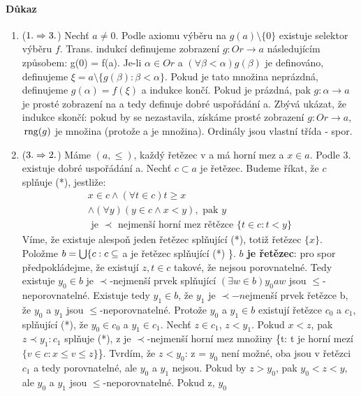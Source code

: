 \documentclass[a4paper,12pt,titlepage]{article}
\begin{document}
\paragraph{Důkaz}
\begin{enumerate}
	\item ($1. \Rightarrow 3.$) Nechť $a \neq 0$. Podle axiomu výběru na $g(a)
	\setminus \{0\}$ existuje selektor výběru $f$. Trans. indukcí definujeme
	zobrazení $g: Or \to a$ následujícím způsobem:
	g(0) = f(a). Je-li $\alpha \in Or$ a $(\forall \beta < \alpha) g(\beta)$ je
	definováno, definujeme $\xi = a \setminus \{g(\beta) : \beta < \alpha \}$.
	Pokud je tato množina neprázdná, definujeme $g(\alpha) = f (\xi)$ a indukce
	končí. Pokud je prázdná, pak $g: \alpha \to a$ je prosté zobrazení na a
	tedy definuje dobré uspořádání a. Zbývá ukázat, že indukce skončí: pokud by
	se nezastavila, získáme prosté zobrazení $g: Or \to a$, $\operatorname*{\,rng}(g)$ je množina
	(protože a je množina). Ordinály jsou vlastní třída - spor.
	\item ($3. \Rightarrow 2.$) Máme $(a, \le)$, každý řetězec v a má horní mez a $x \in
	a$. Podle 3. existuje dobré uspořádání a. Nechť $c \subset a$ je řetězec.
	Budeme říkat, že $c$ splňuje (*), jestliže:
	\begin{align}
		x \in c \land (\forall t \in c) t \ge x \\
		\land (\forall y) (y \in c \land x < y), \text{ pak } y \\
		\text{ je } \prec \text{ nejmenší horní mez rětězce } \{ t \in c: t < y
		\}
	\end{align}
	Víme, že existuje alespoň jeden řetězec splňující (*), totiž řetězec
	$\{x\}$. Položme $b = \bigcup \{ c : c \subseteq$ a je řetězec splňující (*)
	\}. \textbf{$b$ je řetězec}: pro spor předpokládejme, že existují $z,t \in c$ takové,
	že nejsou porovnatelné. Tedy existuje $y_0 \in b$ je $\prec$-nejmenší prvek 
	splňující $(\exists w \in b) y_0 a w$ jsou
	$\le$-neporovnatelné. Existuje tedy $y_1 \in b$, že $y_1$ je $\prec-n$ejmenší prvek řetězce
	b, že $y_0$ a $y_1$ jsou $\le$-neporovnatelné. Protože $y_0$ a $y_1 \in b$
	existují řetězce $c_0$ a $c_1$, splňující (*), že $y_0 \in c_0$ a $y_1 \in
	c_1$. Nechť $z \in c_1$, $z < y_1$. Pokud $x < z$, pak $z \prec y_1: c_1$
	splňuje (*), z je $\prec$-nejmenší horní mez množiny \{t: t je horní mezí $\{v
	\in c: x \le v \le z \}$\}. Tvrdím, že $z < y_0$: z = $y_0$ není možné, oba jsou
	v řetězci $c_1$ a tedy porovnatelné, ale $y_0$ a $y_1$ nejsou. Pokud by $z >
	y_0$, pak $y_0 < z < y$, ale $y_0$ a $y_1$ jsou $\le$-neporovnatelné. Pokud z, $y_0$

\end{enumerate}
\end{document}

